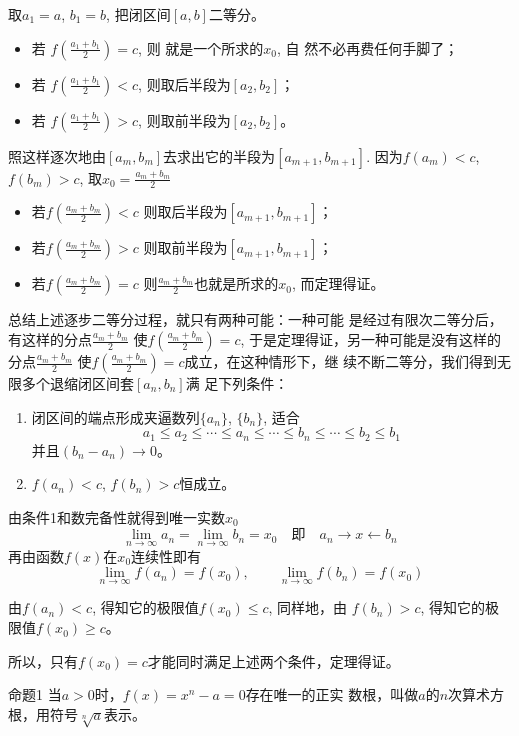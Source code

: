 取$a_1=a$, $b_1=b$, 把闭区间$[a,b]$二等分。
\begin{itemize}
    \item 若
$f\left(\frac{a_1+b_1}{2}\right)=c$, 则
就是一个所求的$x_0$, 自
然不必再费任何手脚了；
\item 若
$f\left(\frac{a_1+b_1}{2}\right)<c$,
则取后半段为$[a_2,b_2]$；
\item 若
$f\left(\frac{a_1+b_1}{2}\right)>c$,
则取前半段为$[a_2,b_2]$。
\end{itemize}
照这样逐次地由$[a_m,b_m]$去求出它的半段为$[a_{m+1},b_{m+1}]$.
因为$f(a_m)<c$, $f(b_m)>c$, 取$x_0=\frac{a_m+b_m}{2}$
\begin{itemize}
    \item 若$f\left(\frac{a_m+b_m}{2}\right)<c$
则取后半段为$[a_{m+1},b_{m+1}]$；
\item 若$f\left(\frac{a_m+b_m}{2}\right)>c$
则取前半段为$[a_{m+1},b_{m+1}]$；
\item 若$f\left(\frac{a_m+b_m}{2}\right)=c$
则$\frac{a_{m}+b_{m}}{2}$也就是所求的$x_0$, 
而定理得证。
\end{itemize}

总结上述逐步二等分过程，就只有两种可能：一种可能
是经过有限次二等分后，有这样的分点$\frac{a_m+b_m}{2}$
使$f\left(\frac{a_m+b_m}{2}\right)=c$, 于是定理得证，另一种可能是没有这样的
分点$\frac{a_m+b_m}{2}$
使$f\left(\frac{a_m+b_m}{2}\right)=c$成立，在这种情形下，继
续不断二等分，我们得到无限多个退缩闭区间套$[a_n,b_n]$满
足下列条件：

\begin{enumerate}
    \item 闭区间的端点形成夹逼数列$\{a_n\}$, $\{b_n\}$, 适合
    \[a_1\le a_2\le \cdots\le a_n\le \cdots \le b_n\le \cdots\le b_2\le b_1\]
并且$(b_n-a_n)\to 0$。
    \item $f(a_n)<c$, $f(b_n)>c$恒成立。

\end{enumerate}

    由条件1和数完备性就得到唯一实数$x_0$
    \[\lim_{n\to\infty} a_n=\lim_{n\to\infty} b_n=x_0\quad \text{即}\quad a_n\to x\leftarrow b_n\]
    再由函数$f(x)$在$x_0$连续性即有
\[    \lim_{n\to\infty} f(a_n) = f(x_0),\qquad \lim_{n\to\infty} f(b_n)=f(x_0)\]

由$f(a_n)<c$, 得知它的极限值$f(x_0)\le c$, 同样地，由
    $f(b_n)>c$, 得知它的极限值$f(x_0)\ge c$。

所以，只有$f(x_0)=c$才能同时满足上述两个条件，定理得证。


\begin{blk}{命题1}
    当$a>0$时，$f(x)=x^n-a=0$存在唯一的正实
    数根，叫做$a$的$n$次算术方根，用符号$\sqrt[n]{a}$表示。
\end{blk}

